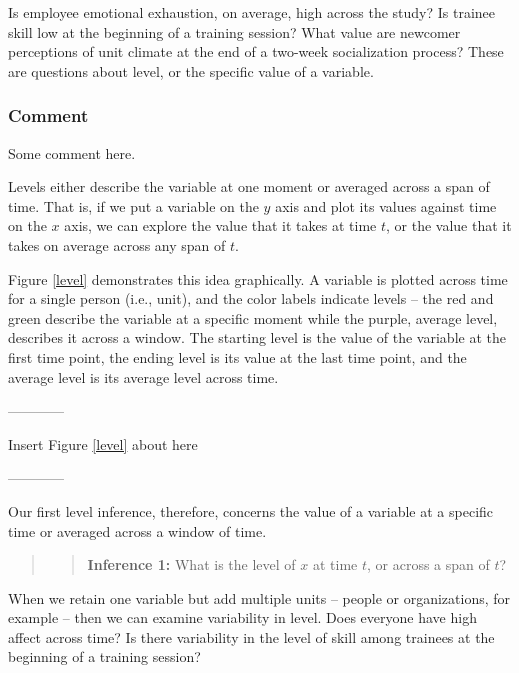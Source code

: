 \documentclass[english,,man]{apa6}
\theoremstyle{definition}
\theoremstyle{definition}
\theoremstyle{definition}
\theoremstyle{remark}
\begin{document}
Is employee emotional exhaustion, on average, high across the study? Is
trainee skill low at the beginning of a training session? What value are
newcomer perceptions of unit climate at the end of a two-week
socialization process? These are questions about level, or the specific
value of a variable.

\hypertarget{comment}{%
\subsubsection{Comment}\label{comment}}

Some comment here.

Levels either describe the variable at one moment or averaged across a
span of time. That is, if we put a variable on the \(y\) axis and plot
its values against time on the \(x\) axis, we can explore the value that
it takes at time \(t\), or the value that it takes on average across any
span of \(t\).

Figure \ref{level} demonstrates this idea graphically. A variable is
plotted across time for a single person (i.e., unit), and the color
labels indicate levels -- the red and green describe the variable at a
specific moment while the purple, average level, describes it across a
window. The starting level is the value of the variable at the first
time point, the ending level is its value at the last time point, and
the average level is its average level across time.

\begin{center}

------------

Insert Figure \ref{level} about here

------------

\end{center}

\noindent Our first level inference, therefore, concerns the value of a
variable at a specific time or averaged across a window of time.

\begin{quote}
\begin{quote}
\textbf{Inference 1:} What is the level of \(x\) at time \(t\), or
across a span of \(t\)?
\end{quote}
\end{quote}

When we retain one variable but add multiple units -- people or
organizations, for example -- then we can examine variability in level.
Does everyone have high affect across time? Is there variability in the
level of skill among trainees at the beginning of a training session?
\end{document}
